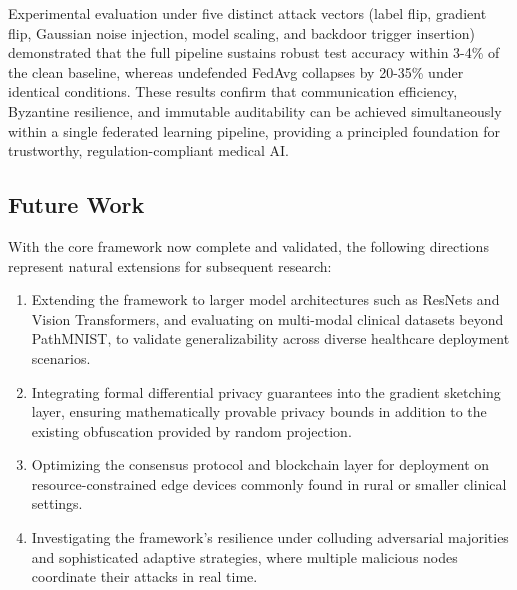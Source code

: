 \documentclass[12pt,a4paper]{article}
\begin{document}
Experimental evaluation under five distinct attack vectors (label flip, gradient flip, Gaussian noise injection, model scaling, and backdoor trigger insertion) demonstrated that the full pipeline sustains robust test accuracy within 3-4\% of the clean baseline, whereas undefended FedAvg collapses by 20-35\% under identical conditions. These results confirm that communication efficiency, Byzantine resilience, and immutable auditability can be achieved simultaneously within a single federated learning pipeline, providing a principled foundation for trustworthy, regulation-compliant medical AI.

\subsection{Future Work}
With the core framework now complete and validated, the following directions represent natural extensions for subsequent research:
\begin{enumerate}
    \item Extending the framework to larger model architectures such as ResNets and Vision Transformers, and evaluating on multi-modal clinical datasets beyond PathMNIST, to validate generalizability across diverse healthcare deployment scenarios.
    \item Integrating formal differential privacy guarantees into the gradient sketching layer, ensuring mathematically provable privacy bounds in addition to the existing obfuscation provided by random projection.
    \item Optimizing the consensus protocol and blockchain layer for deployment on resource-constrained edge devices commonly found in rural or smaller clinical settings.
    \item Investigating the framework's resilience under colluding adversarial majorities and sophisticated adaptive strategies, where multiple malicious nodes coordinate their attacks in real time.
\end{enumerate}
\end{document}

